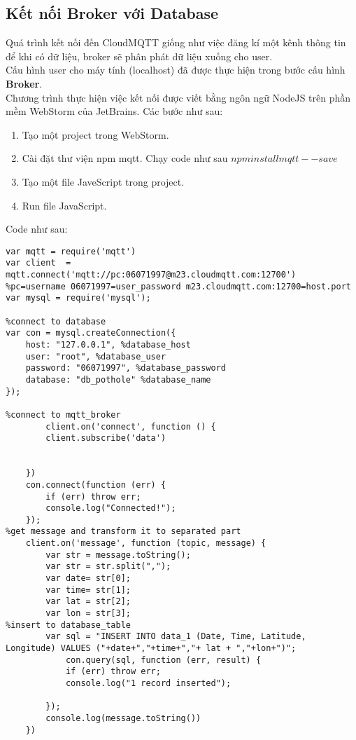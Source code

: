 \subsection{Kết nối Broker với Database}
Quá trình kết nối đến CloudMQTT giống như việc đăng kí một kênh thông tin để khi có dữ liệu, broker sẽ phân phát dữ liệu xuống cho user.\\
Cấu hình user cho máy tính (localhost) đã được thực hiện trong bước cấu hình \textbf{Broker}.\\
Chương trình thực hiện việc kết nối được viết bằng ngôn ngữ NodeJS trên phần mềm WebStorm của JetBrains.
Các bước như sau:
\begin{enumerate}
\item Tạo một project trong WebStorm.
\item Cài đặt thư viện npm mqtt. Chạy code như sau $npm install mqtt --save$
\item Tạo một file JaveScript trong project. 
\item Run file JavaScript.
\end{enumerate}
Code như sau:
\begin{lstlisting}[style=myArduino]
var mqtt = require('mqtt')
var client  = mqtt.connect('mqtt://pc:06071997@m23.cloudmqtt.com:12700')
%pc=username 06071997=user_password m23.cloudmqtt.com:12700=host.port
var mysql = require('mysql');

%connect to database
var con = mysql.createConnection({
    host: "127.0.0.1", %database_host
    user: "root", %database_user
    password: "06071997", %database_password
    database: "db_pothole" %database_name
});

%connect to mqtt_broker
        client.on('connect', function () {
        client.subscribe('data')
      

    })
    con.connect(function (err) {
        if (err) throw err;
        console.log("Connected!");
    });
%get message and transform it to separated part
    client.on('message', function (topic, message) {
        var str = message.toString();
        var str = str.split(",");
        var date= str[0];
        var time= str[1];
        var lat = str[2];
        var lon = str[3];
%insert to database_table
        var sql = "INSERT INTO data_1 (Date, Time, Latitude, Longitude) VALUES ("+date+","+time+","+ lat + ","+lon+")";
            con.query(sql, function (err, result) {
            if (err) throw err;
            console.log("1 record inserted");

        });
        console.log(message.toString())
    })
\end{lstlisting}

